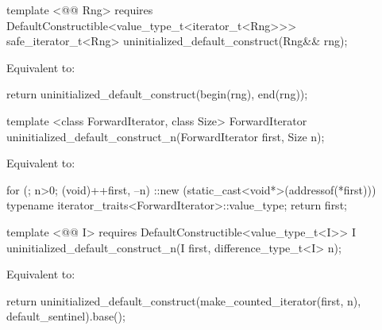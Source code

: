 
{\color{addclr}
\begin{codeblock}
template <@@ Rng>
  requires
DefaultConstructible<value_type_t<iterator_t<Rng>>>
  safe_iterator_t<Rng> uninitialized_default_construct(Rng&& rng);
\end{codeblock}

\pnum
\effects Equivalent to:
\begin{codeblock}
        return uninitialized_default_construct(begin(rng), end(rng));
\end{codeblock}
} %

{\color{remclr}
\begin{codeblock}
template <class ForwardIterator, class Size>
  ForwardIterator uninitialized_default_construct_n(ForwardIterator first, Size n);
\end{codeblock}

\setcounter{Paras}{1}
\pnum
\effects Equivalent to:
\begin{codeblock}
        for (; n>0; (void)++first, --n)
          ::new (static_cast<void*>(addressof(*first)))
            typename iterator_traits<ForwardIterator>::value_type;
        return first;
\end{codeblock}
} %

{\color{addclr}

\begin{codeblock}
template <@@ I>
  requires
DefaultConstructible<value_type_t<I>>
  I uninitialized_default_construct_n(I first, difference_type_t<I> n);
\end{codeblock}

\pnum
\effects Equivalent to:
\begin{codeblock}
    return uninitialized_default_construct(make_counted_iterator(first, n),
      default_sentinel{}).base();
\end{codeblock}
} %

